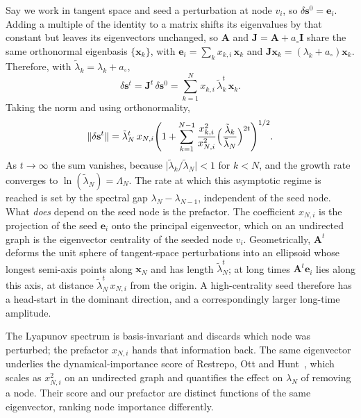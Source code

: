 \documentclass[a4paper,fleqn]{cas-dc}
\begin{document}
Say we work in tangent space and seed a perturbation at node $v_i$, so $\delta\mathbf{s}^0=\mathbf{e}_i$. Adding a multiple of the identity to a matrix shifts its eigenvalues by that constant but leaves its eigenvectors unchanged, so $\mathbf{A}$ and $\mathbf{J}=\mathbf{A}+a_\circ\mathbf{I}$ share the same orthonormal eigenbasis $\{\mathbf{x}_k\}$, with $\mathbf{e}_i=\sum_k x_{k,i}\,\mathbf{x}_k$ and $\mathbf{J}\mathbf{x}_k=(\lambda_k+a_\circ)\mathbf{x}_k$. Therefore, with $\tilde{\lambda}_k = \lambda_k + a_\circ$, 
\begin{equation}
    \delta\mathbf{s}^t=\mathbf{J}^t\,\delta\mathbf{s}^0
    =\sum_{k=1}^{N}x_{k,i}\,\tilde{\lambda}_k^t\,\mathbf{x}_k.
\end{equation}
Taking the norm and using orthonormality,
\begin{equation}
    \label{eq:perturbation-norm}
    \lVert\delta\mathbf{s}^t\rVert
    =\tilde{\lambda}_N^t\,x_{N,i}
    \Biggl(1+\sum_{k=1}^{N-1}\frac{x_{k,i}^2}{x_{N,i}^2}
    \Bigl(\frac{\tilde{\lambda}_k}{\tilde{\lambda}_N}\Bigr)^{2t}\Biggr)^{1/2}.
\end{equation}
As $t\to\infty$ the sum vanishes, because $\lvert\tilde{\lambda}_k/\tilde{\lambda}_N\rvert<1$ for $k<N$, and the growth rate converges to $\ln(\tilde{\lambda}_N)=\Lambda_N$. The rate at which this asymptotic regime is reached is set by the spectral gap $\lambda_N-\lambda_{N-1}$, independent of the seed node. What \emph{does} depend on the seed node is the prefactor. The coefficient $x_{N,i}$ is the projection of the seed $\mathbf{e}_i$ onto the principal eigenvector, which on an undirected graph is the eigenvector centrality of the seeded node $v_i$. Geometrically, $\mathbf{A}^t$ deforms the unit sphere of tangent-space perturbations into an ellipsoid whose longest semi-axis points along $\mathbf{x}_N$ and has length $\tilde{\lambda}_N^t$; at long times $\mathbf{A}^t \mathbf{e}_i$ lies along this axis, at distance $\tilde{\lambda}_N^t \, x_{N,i}$ from the origin. A high-centrality seed therefore has a head-start in the dominant direction, and a correspondingly larger long-time amplitude.

The Lyapunov spectrum is basis-invariant and discards which node was perturbed; the prefactor $x_{N,i}$ hands that information back. The same eigenvector underlies the dynami\-cal-importance score of Restrepo, Ott and Hunt~\cite{restrepo2006characterizing}, which scales as $x_{N,i}^2$ on an undirected graph and quantifies the effect on $\lambda_N$ of removing a node. Their score and our prefactor are distinct functions of the same eigenvector, ranking node importance differently.
\end{document}
